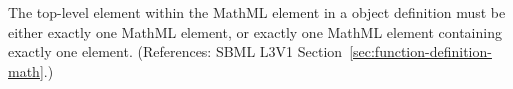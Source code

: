 The top-level element within the MathML  element in a
\FunctionDefinition object definition must be either exactly one MathML
 element, or exactly one MathML  element
containing exactly one  element.  (References: SBML L3V1
Section~\ref{sec:function-definition-math}.)
